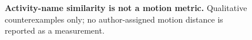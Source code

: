 \begin{figure}[t]
\centering
\setlength{\abovecaptionskip}{3pt}
\setlength{\belowcaptionskip}{-4pt}
\caption{\textbf{Activity-name similarity is not a motion metric.} Qualitative counterexamples
only; no author-assigned motion distance is reported as a measurement.}
\label{fig:geometry}
\end{figure}
